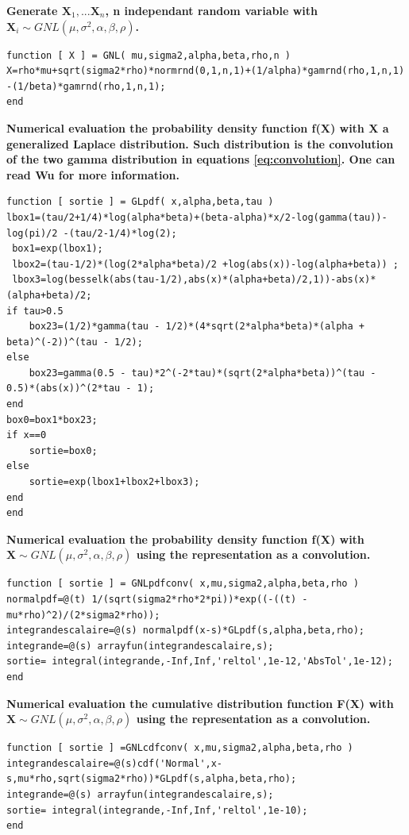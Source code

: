 \documentclass[12pt,travaildirige,nobabel, twoside]{dms}
\numberwithin{equation}{section}
\numberwithin{table}{chapter}
\numberwithin{figure}{chapter}
\begin{document}
\noindent
\textbf{Generate $\textbf{X}_1,...\textbf{X}_n$, n independant random variable with  $\textbf{X}_i\sim GNL(\mu,\sigma^2,\alpha,\beta,\rho)$.} 
\begin{lstlisting}
function [ X ] = GNL( mu,sigma2,alpha,beta,rho,n )
X=rho*mu+sqrt(sigma2*rho)*normrnd(0,1,n,1)+(1/alpha)*gamrnd(rho,1,n,1) -(1/beta)*gamrnd(rho,1,n,1);
end
\end{lstlisting}

\noindent
\textbf{Numerical evaluation the probability density function f(\textbf{X}) with \textbf{X} a generalized Laplace distribution. Such distribution is the convolution of the two gamma distribution in equations \ref{eq:convolution}. One can read Wu \citep{appGNL} for more information.}
\begin{lstlisting}
function [ sortie ] = GLpdf( x,alpha,beta,tau )
lbox1=(tau/2+1/4)*log(alpha*beta)+(beta-alpha)*x/2-log(gamma(tau))-log(pi)/2 -(tau/2-1/4)*log(2);
 box1=exp(lbox1);
 lbox2=(tau-1/2)*(log(2*alpha*beta)/2 +log(abs(x))-log(alpha+beta)) ;
 lbox3=log(besselk(abs(tau-1/2),abs(x)*(alpha+beta)/2,1))-abs(x)*(alpha+beta)/2;
if tau>0.5
    box23=(1/2)*gamma(tau - 1/2)*(4*sqrt(2*alpha*beta)*(alpha + beta)^(-2))^(tau - 1/2);
else
    box23=gamma(0.5 - tau)*2^(-2*tau)*(sqrt(2*alpha*beta))^(tau - 0.5)*(abs(x))^(2*tau - 1);
end
box0=box1*box23;
if x==0
    sortie=box0;
else
    sortie=exp(lbox1+lbox2+lbox3);
end
end
\end{lstlisting}

\noindent
\textbf{Numerical evaluation the probability density function f(\textbf{X}) with $\textbf{X}\sim GNL(\mu,\sigma^2,\alpha,\beta,\rho)$ using the representation as a convolution.}
\begin{lstlisting}
function [ sortie ] = GNLpdfconv( x,mu,sigma2,alpha,beta,rho )
normalpdf=@(t) 1/(sqrt(sigma2*rho*2*pi))*exp((-((t) - mu*rho)^2)/(2*sigma2*rho));
integrandescalaire=@(s) normalpdf(x-s)*GLpdf(s,alpha,beta,rho);
integrande=@(s) arrayfun(integrandescalaire,s);
sortie= integral(integrande,-Inf,Inf,'reltol',1e-12,'AbsTol',1e-12);
end
\end{lstlisting}

\noindent
\textbf{Numerical evaluation the cumulative distribution function F(\textbf{X}) with $\textbf{X}\sim GNL(\mu,\sigma^2,\alpha,\beta,\rho)$ using the representation as a convolution.}
\begin{lstlisting}
function [ sortie ] =GNLcdfconv( x,mu,sigma2,alpha,beta,rho )
integrandescalaire=@(s)cdf('Normal',x-s,mu*rho,sqrt(sigma2*rho))*GLpdf(s,alpha,beta,rho);
integrande=@(s) arrayfun(integrandescalaire,s);
sortie= integral(integrande,-Inf,Inf,'reltol',1e-10);
end
\end{lstlisting}
\end{document}

